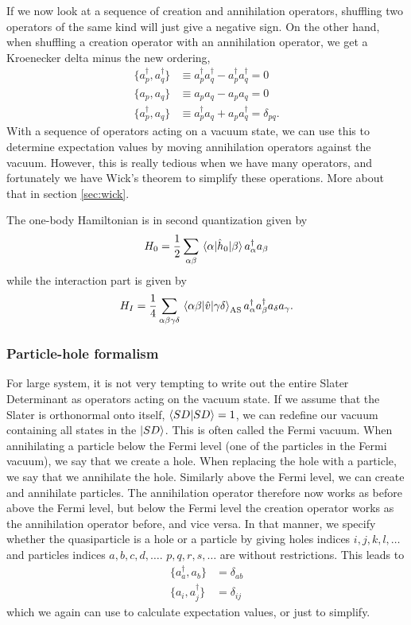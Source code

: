 If we now look at a sequence of creation and annihilation operators, shuffling two operators of the same kind will just give a negative sign. On the other hand, when shuffling a creation operator with an annihilation operator, we get a Kroenecker delta minus the new ordering,
\begin{align}
	\{a_p^{\dagger},a_q^{\dagger}\}&\equiv a_p^{\dagger}a_q^{\dagger}-a_p^{\dagger}a_q^{\dagger}=0\\
	\{a_p,a_q\}&\equiv a_pa_q-a_pa_q=0\\
	\{a_p^{\dagger},a_q\}&\equiv a_p^{\dagger}a_q+a_pa_q^{\dagger}=\delta_{pq}.
\end{align}
With a sequence of operators acting on a vacuum state, we can use this to determine expectation values by moving annihilation operators against the vacuum. However, this is really tedious when we have many operators, and fortunately we have Wick's theorem to simplify these operations. More about that in section \eqref{sec:wick}.

The one-body Hamiltonian is in second quantization given by
\begin{equation}
	H_0=\frac{1}{2}\sum_{\alpha\beta}\mel{\alpha}{\hat{h}_0}{\beta}a_{\alpha}^{\dagger}a_{\beta}
\end{equation}
while the interaction part is given by
\begin{equation}
	H_I=\frac{1}{4}\sum_{\alpha\beta\gamma\delta}\mel{\alpha\beta}{\hat{v}}{\gamma\delta}_{\text{AS}}a_{\alpha}^{\dagger}a_{\beta}^{\dagger}a_{\delta}a_{\gamma}.
\end{equation}

\subsubsection{Particle-hole formalism}
For large system, it is not very tempting to write out the entire Slater Determinant as operators acting on the vacuum state. If we assume that the Slater is orthonormal onto itself, $\braket{SD}{SD}=1$, we can redefine our vacuum containing all states in the $\ket{SD}$. This is often called the Fermi vacuum. When annihilating a particle below the Fermi level (one of the particles in the Fermi vacuum), we say that we create a hole. When replacing the hole with a particle, we say that we annihilate the hole. Similarly above the Fermi level, we can create and annihilate particles. The annihilation operator therefore now works as before above the Fermi level, but below the Fermi level the creation operator works as the annihilation operator before, and vice versa. In that manner, we specify whether the quasiparticle is a hole or a particle by giving holes indices $i,j,k,l,\hdots$ and particles indices $a,b,c,d,\hdots$. $p,q,r,s,\hdots$ are without restrictions. This leads to
\begin{align}
	\{a_a^{\dagger},a_b\}&=\delta_{ab}\\
	\{a_i,a_j^{\dagger}\}&=\delta_{ij}
\end{align}
which we again can use to calculate expectation values, or just to simplify. 

